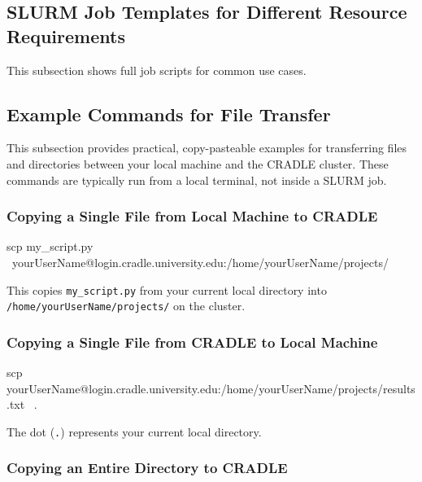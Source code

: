 \documentclass[11pt]{article}
\begin{document}

\subsection{SLURM Job Templates for Different Resource Requirements}
\label{subsec:slurm-templates}

This subsection shows full job scripts for common use cases.


\subsection{Example Commands for File Transfer}
\label{subsec:file-transfer-examples}

This subsection provides practical, copy-pasteable examples for transferring
files and directories between your local machine and the CRADLE cluster.
These commands are typically run from a local terminal, not inside a SLURM job.

\subsubsection{Copying a Single File from Local Machine to CRADLE}

\begin{codeblock}
scp my_script.py \
    yourUserName@login.cradle.university.edu:/home/yourUserName/projects/
\end{codeblock}

This copies \texttt{my\_script.py} from your current local directory into
\texttt{/home/yourUserName/projects/} on the cluster.

\subsubsection{Copying a Single File from CRADLE to Local Machine}

\begin{codeblock}
scp yourUserName@login.cradle.university.edu:/home/yourUserName/projects/results.txt \
    .
\end{codeblock}

The dot (\texttt{.}) represents your current local directory.

\subsubsection{Copying an Entire Directory to CRADLE}
\end{document}
